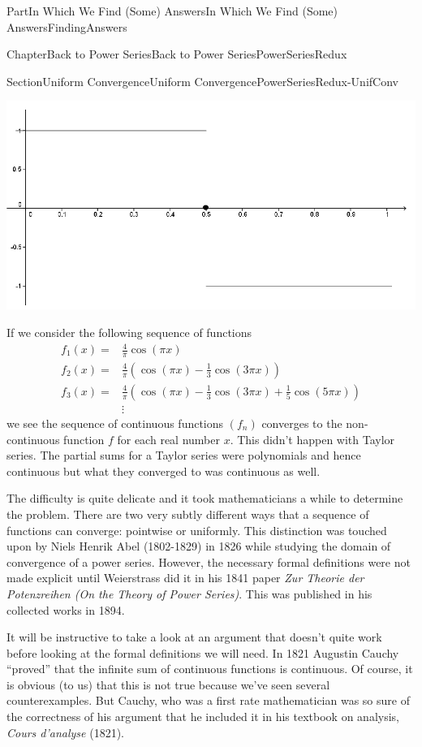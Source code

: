 \documentclass[oneside,10pt,]{book}
\newcommand{\pubtitle}[1]{\textsl{#1}}
\numberwithin{equation}{part}
\newcommand{\amp}{&}
\begin{document}
\begin{partptx}{Part}{In Which We Find (Some) Answers}{}{In Which We Find (Some) Answers}{}{}{FindingAnswers}
\begin{chapterptx}{Chapter}{Back to Power Series}{}{Back to Power Series}{}{}{PowerSeriesRedux}
\begin{sectionptx}{Section}{Uniform Convergence}{}{Uniform Convergence}{}{}{PowerSeriesRedux-UnifConv}
\begin{image}{0.075}{0.85}{0.075}{}
\includegraphics[width=\linewidth]{external/images/Ch7fig1.png}
\end{image}%
If we consider the following sequence of functions%
\begin{align*}
f_1(x)=\amp \frac{4}{\pi}\cos\left(\pi x\right)\\
f_2(x)=\amp \frac{4}{\pi}\left(\cos \left(\pi x\right)-\frac{1}{3}\cos\left( 3\pi x\right)\right)\\
f_3(x)=\amp \frac{4}{\pi}\left(\cos\left(\pi x\right)-\frac{1}{3}\cos\left(3\pi x\right)+\frac{1}{5}\cos\left(5\pi x\right)\right)\\
\amp \vdots
\end{align*}
we see the sequence of continuous functions \(\left(f_n\right)\) converges to the non-continuous function \(f\) for each real number \(x\).  This didn't happen with Taylor series.  The partial sums for a Taylor series were polynomials and hence continuous but what they converged to was continuous as well.%
\par
The difficulty is quite delicate and it took mathematicians a while to determine the problem.  There are two very subtly different ways that a sequence of functions can converge: pointwise or uniformly.  This distinction was touched upon by Niels Henrik Abel (1802-1829) in 1826 while studying the domain of convergence of a power series.  However, the necessary formal definitions were not made explicit until Weierstrass did it in his 1841 paper \pubtitle{Zur Theorie der Potenzreihen (On the Theory of Power Series)}. This was published in his collected works in 1894.%
\par
It will be instructive to take a look at an argument that doesn't quite work before looking at the formal definitions we will need.  In 1821 Augustin Cauchy ``proved'' that the infinite sum of continuous functions is continuous.  Of course, it is obvious (to us) that this is not true because we've seen several counterexamples.  But Cauchy, who was a first rate mathematician was so sure of the correctness of his argument that he included it in his textbook on analysis, \textit{Cours d'analyse} (1821).%

\end{sectionptx}
\end{chapterptx}
\end{partptx}
\end{document}
